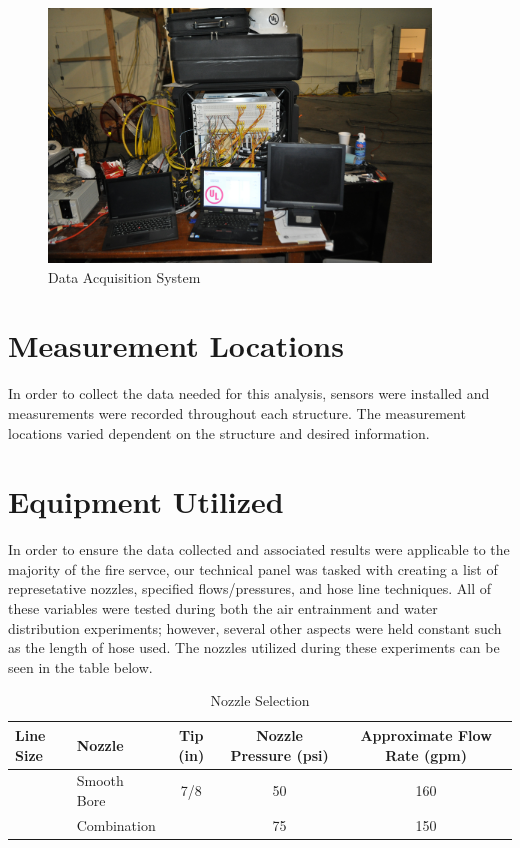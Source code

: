 \documentclass[12pt,oneside]{book}
\begin{document}
\begin{figure}[H]
	\centering
	\includegraphics[width = 4in]{0_Images/Instrumentation/DataSystem.jpg}
	\caption{Data Acquisition System}
	\label{fig:DataSystem}
\end{figure}

\clearpage

\section{Measurement Locations}

In order to collect the data needed for this analysis, sensors were installed and measurements were recorded throughout each structure. The measurement locations varied dependent on the structure and desired information.

\clearpage

\section{Equipment Utilized}

In order to ensure the data collected and associated results were applicable to the majority of the fire servce, our technical panel was tasked with creating a list of represetative nozzles, specified flows/pressures, and hose line techniques. All of these variables were tested during both the air entrainment and water distribution experiments; however, several other aspects were held constant such as the length of hose used. The nozzles utilized during these experiments can be seen in the table below.

\begin{table}[!ht]
\caption{Nozzle Selection}
\centering
\begin{tabular}{llccc}
\toprule
\textbf{Line Size} & \textbf{Nozzle} & \textbf{Tip (in)} & \textbf{Nozzle Pressure (psi)} & \textbf{Approximate Flow Rate (gpm)} \\ 
\midrule
& Smooth Bore & 7/8 & 50 & 160 \\
& Combination &  & 75 & 150 \\
\bottomrule
\end{tabular}
\label{table:nozzle_selection}
\end{table}
\end{document}
